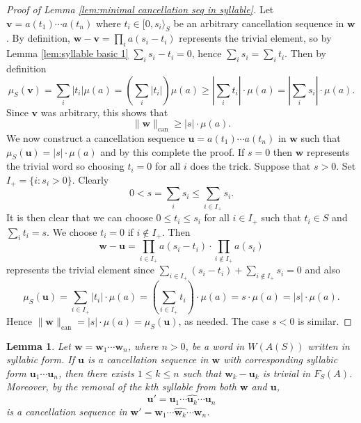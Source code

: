 \documentclass[12pt]{amsart}
\newtheorem{lemma}[prop]{Lemma}
\theoremstyle{definition}
\newcommand{\B}[1]{\mathbf{#1}}
\def\can{\text{can}}
\def\Free{F}
\newcommand{\myinterval}[1]{[ #1 \rangle}
\begin{document}
\begin{proof}[Proof of Lemma \ref{lem:minimal cancellation seq in syllable}]
Let $\B v =a(t_1) \cdots a(t_n)$ where $t_i \in \myinterval{0,s_i}_S$  be an arbitrary cancellation sequence in $\B w$.
By definition, $\B w - \B v = \prod_i a(s_i-t_i)$ represents the trivial element, so by Lemma \ref{lem:syllable basic 1} $\sum_i s_i-t_i=0$, hence $\sum_i s_i = \sum_i t_i$.
Then by definition
\[
\mu_S(\B v) = \sum_i |t_i| \mu(a) = \left(\sum_i |t_i|\right) \mu(a) 
\geq \left|\sum_i t_i\right| \cdot \mu(a) = \left|\sum_i s_i\right| \cdot \mu(a).
\]
Since $\B v$ was arbitrary, this shows that
\[
\| \B w\|_{\can} \geq |s| \cdot \mu(a).
\]
We now construct a cancellation sequence $\B u=a(t_1) \cdots a(t_n)$ in $\B w$ such that $\mu_S(\B u)=|s| \cdot \mu(a)$ and by this complete the proof.
If $s =0$ then $\B w$ represents the trivial word so choosing $t_i=0$ for all $i$ does the trick.
Suppose that $s > 0$.
Set $I_+=\{i : s_i >0\}$. %
Clearly
\[
0 < s = \sum_i s_i   \leq \sum_{i \in I_+} s_i.
\]
It is then clear that we can choose $0 \leq t_i \leq s_i$ for all $i \in I_+$ such that $t_i \in S$ and $\sum_i t_i =s$.
We choose $t_i=0$ if $i \notin I_+$.
Then
\[
\B w - \B u = \prod_{i \in I_+} a(s_i-t_i) \cdot \prod_{i \notin I_+}  a(s_i)
\]
represents the trivial element since $\sum_{i \in I_+} (s_i-t_i) + \sum_{i \notin I_+} s_i = 0$ and also
\[
\mu_S(\B u) = \sum_{i \in I_+} |t_i| \cdot \mu(a) =  \left(\sum_{i \in I_+} t_i\right) \cdot \mu(a) = s \cdot \mu(a) = |s| \cdot \mu(a).
\]
Hence $\|\B w\|_{\can} = |s| \cdot \mu(a) = \mu_S(\B u)$, as needed.
The case $s<0$ is similar.
\end{proof}







\begin{lemma}\label{lem:cancel entire syllable}
Let $\B w=\B w_1 \cdots \B w_n$, where $n>0$, be a word in $W(A(S))$ written in syllabic form.
If $\B u$ is a cancellation sequence in $\B w$ with corresponding syllabic form $\B u_1 \cdots \B u_n$, then there exists $1 \leq k \leq n$ such that $\B w_k - \B u_k$ is trivial in $\Free_S(A)$.
Moreover, by the removal of the $k$th syllable from both $\B w$ and $\B u$,
\[
\B u' = \B u_1 \cdots \widehat{\B u_k} \cdots \B u_n
\]
is a cancellation sequence in $\B w' = \B w_1 \cdots \widehat{\B w_k} \cdots \B w_n$.
\end{lemma}
\end{document}

